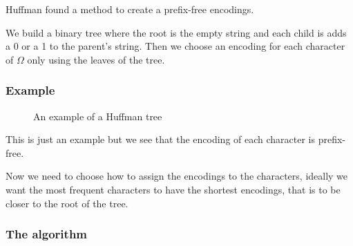 \documentclass[12pt]{extarticle}
\begin{document}
Huffman found a method to create a prefix-free encodings.

We build a binary tree where the root is the empty string and each child is adds a 0 or a 1 to the parent's string.
Then we choose an encoding for each character of $\Omega$ only using the leaves of the tree.

\subsubsection{Example}

\begin{figure}[H]
    \centering

    \caption{An example of a Huffman tree}
    \label{fig:huffman_tree}
\end{figure}

This is just an example but we see that the encoding of each character is prefix-free.

Now we need to choose how to assign the encodings to the characters, ideally we want the most frequent characters to have the shortest encodings, that is to be closer to the root of the tree.

\subsubsection{The algorithm}
\end{document}

